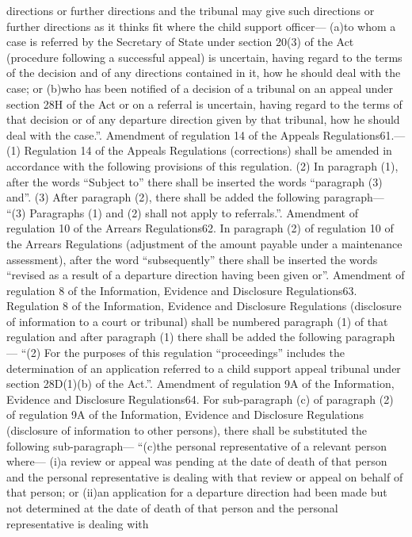 \documentclass[a4paper]{article}
\begin{document}
directions or further directions and the tribunal may give such directions or
further directions as it thinks fit where the child support officer—
(a)to whom a case is referred by the Secretary of State under section 20(3) of
the Act (procedure following a successful appeal) is uncertain, having regard to
the terms of the decision and of any directions contained in it, how he should
deal with the case; or
(b)who has been notified of a decision of a tribunal on an appeal under section
28H of the Act or on a referral is uncertain, having regard to the terms of that
decision or of any departure direction given by that tribunal, how he should
deal with the case.”.
Amendment of regulation 14 of the Appeals Regulations61.—(1) Regulation 14 of
the Appeals Regulations (corrections) shall be amended in accordance with the
following provisions of this regulation.
(2) In paragraph (1), after the words “Subject to” there shall be inserted the
words “paragraph (3) and”.
(3) After paragraph (2), there shall be added the following paragraph—
“(3) Paragraphs (1) and (2) shall not apply to referrals.”.
Amendment of regulation 10 of the Arrears Regulations62. In paragraph (2) of
regulation 10 of the Arrears Regulations (adjustment of the amount payable under
a maintenance assessment), after the word “subsequently” there shall be inserted
the words “revised as a result of a departure direction having been given or”.
Amendment of regulation 8 of the Information, Evidence and Disclosure
Regulations63. Regulation 8 of the Information, Evidence and Disclosure
Regulations (disclosure of information to a court or tribunal) shall be numbered
paragraph (1) of that regulation and after paragraph (1) there shall be added
the following paragraph—
“(2) For the purposes of this regulation “proceedings” includes the
determination of an application referred to a child support appeal tribunal
under section 28D(1)(b) of the Act.”.
Amendment of regulation 9A of the Information, Evidence and Disclosure
Regulations64. For sub-paragraph (c) of paragraph (2) of regulation 9A of the
Information, Evidence and Disclosure Regulations (disclosure of information to
other persons), there shall be substituted the following sub-paragraph—
“(c)the personal representative of a relevant person where—
(i)a review or appeal was pending at the date of death of that person and the
personal representative is dealing with that review or appeal on behalf of that
person; or
(ii)an application for a departure direction had been made but not determined at
the date of death of that person and the personal representative is dealing with
\end{document}
